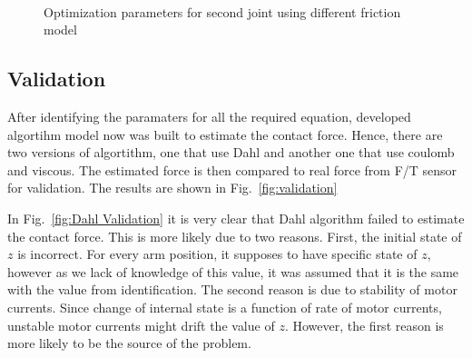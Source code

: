 \documentclass[letterpaper, 10 pt, conference]{ieeeconf}
\newcommand{\fref}[1]{Fig.~\ref{#1}}
\begin{document}
\begin{figure}
  \centering
  \,
  \,
  \caption{Optimization parameters for second joint using different friction model}
  \label{fig:optimization}
\end{figure}

\subsection{Validation}
\label{validation}

After identifying the paramaters for all the required equation, developed algortihm model now was built to estimate the contact force. Hence, there are two versions of algortithm, one that use Dahl and another one that use coulomb and viscous. The estimated force is then compared to real force from F/T sensor for validation. The results are shown in \fref{fig:validation} 

In \fref{fig:Dahl Validation} it is very clear that Dahl algorithm failed to estimate the contact force. This is more likely due to two reasons. First, the initial state of $z$ is incorrect. For every arm position, it supposes to have specific state of $z$, however as we lack of knowledge of this value, it was assumed that it is the same with the value from identification. The second reason is due to stability of motor currents. Since change of internal state is a function of rate of motor currents, unstable motor currents might drift the value of $z$. However, the first reason is more likely to be the source of the problem.
\end{document}
